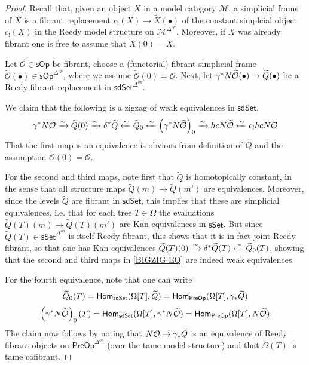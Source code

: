\documentclass[a4paper,10pt
,draft
]{article}%
\renewcommand{\1}{\ensuremath{\mathbb{id}}}
\begin{document}
\begin{proof}
	Recall that, given an object $X$ in a model category $\mathcal{M}$, a simplicial frame of $X$ is a fibrant replacement
	$c_!(X) \to \widetilde{X}(\bullet)$ of the constant 
	simplcial object $c_!(X)$ in the Reedy model structure on $\mathcal{M}^{\Delta^{op}}$.
	Moreover, if $X$ was already fibrant one is free to assume that $\widetilde{X}(0) = X$.
	
	Let $\mathcal{O} \in \mathsf{sOp}$ be fibrant, 
	choose a (functorial) fibrant simplicial frame
	$\widetilde{\mathcal{O}}(\bullet) \in \mathsf{sOp}^{\Delta^{op}}$, where we assume $\widetilde{\mathcal{O}} (0) = \mathcal{O}$.
	Next, let 
	$\gamma^{\**} N \widetilde{\mathcal{O}}(\bullet) 
	\to \widetilde{Q}(\bullet)$
	be a Reedy fibrant replacement in  
	$\mathsf{sdSet}^{\Delta^{op}}$.
	
	We claim that the following is a zigzag of weak equivalences in $\mathsf{sdSet}$.
\begin{equation}\label{BIGZIG EQ}
	\gamma^{\**} N \mathcal{O} \xrightarrow{\sim}
	\widetilde{Q}(0) \xrightarrow{\sim}
	\delta^{\**} \widetilde{Q} \xleftarrow{\sim}
	\widetilde{Q}_0 \xleftarrow{\sim}
	\left(\gamma^{\**} N \widetilde{\mathcal{O}}\right)_0
	\xrightarrow{\sim}
	hcN \widetilde{\mathcal{O}} \xleftarrow{\sim}
	c_{!} hcN \mathcal{O}
\end{equation}
That the first map is an equivalence is obvious from definition of $\widetilde{Q}$ and the assumption $\widetilde{\mathcal{O}}(0) = \mathcal{O}$.

For the second and third maps, note first that $\widetilde{Q}$ is homotopically constant, in the sense that all structure maps $\widetilde{Q}(m) \to \widetilde{Q}(m')$
are equivalences.
Moreover, since the levels $\widetilde{Q}$ are fibrant in 
$\mathsf{sdSet}$, this implies that these are simplicial equivalences, i.e. that for each tree $T \in \Omega$
the evaluations 
$\widetilde{Q}(T)(m) \to \widetilde{Q}(T)(m')$
are Kan equivalences in $\mathsf{sSet}$.
But since $\widetilde{Q}(T) \in \mathsf{sSet}^{\Delta^{op}}$ is itself Reedy fibrant, this shows that it is in fact joint Reedy fibrant, so that one has Kan equivalences 
$\widetilde{Q}(T)(0) \xrightarrow{\sim}
\delta^{\**} \widetilde{Q}(T) \xleftarrow{\sim}
\widetilde{Q}_0(T)$, showing that the second and third maps in \eqref{BIGZIG EQ} are indeed weak equivalences.

For the fourth equivalence, note that one can write
\[\widetilde{Q}_0(T) = 
\mathsf{Hom}_{\mathsf{sdSet}}(\Omega[T],\widetilde{Q})=
\mathsf{Hom}_{\mathsf{PreOp}}(\Omega[T],\gamma_{\**}\widetilde{Q})\]
\[
\left(\gamma^{\**} N \widetilde{\mathcal{O}}\right)_0(T) = 
\mathsf{Hom}_{\mathsf{sdSet}}(\Omega[T],\gamma^{\**} N \widetilde{\mathcal{O}})=
\mathsf{Hom}_{\mathsf{PreOp}}(\Omega[T], N \widetilde{\mathcal{O}})
\]
The claim now follows by noting that
$N \mathcal{O} \to \gamma_{\**} \widetilde{Q}$
is an equivalence of Reedy fibrant objects on 
$\mathsf{PreOp}^{\Delta^{op}}$ (over the tame model structure) and that $\Omega(T)$ is tame cofibrant. 


\end{proof}
\end{document}
